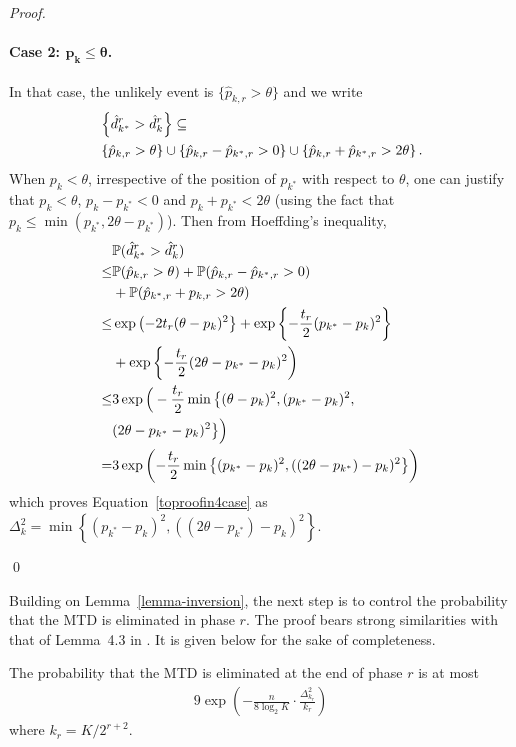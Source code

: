 \begin{proof}
\paragraph{Case 2: $\bm{p_k \leq \theta}$.} In that case, the unlikely event is $\{\hat{p}_{k,r} > \theta\}$ and we write 
\begin{align*}
&\Set{\hat{d}^r_{k^*} > \hat{d}^r_k} \subseteq
\\ &
\Set{\hat{p}_{k,r} > \theta} \cup \Set{\hat{p}_{{k},r} - \hat{p}_{k^*,r} > 0}\cup \Set{\hat{p}_{k,r} + \hat{p}_{{k^*},r} > 2\theta}.
\end{align*}
When $p_k < \theta$, irrespective of the position of $p_{k^*}$ with respect to $\theta$, one can justify that $p_k < \theta$, $p_{k} - p_{k^*} < 0$ and ${p}_{k} + {p}_{{k^*}} < 2\theta$ (using the fact that $p_k \leq \min(p_{k^*},2\theta - p_{k^*})$). Then from Hoeffding's inequality,  
\begin{align*}
&\mathbb{P}(\hat{d}^r_{k^*} > \hat{d}^r_k)
\\ \leq &
	\mathbb{P}(\hat{p}_{k,r} > \theta)
	+ \mathbb{P}(\hat{p}_{{k},r} - \hat{p}_{k^*,r} > 0)
\\&	+ \mathbb{P}(\hat{p}_{k^*,r} + p_{k,r} > 2\theta)
\\ \leq &
	\exp\left( -2t_r (\theta - p_k)^2 \right\}
	+ \exp\left\{ - \frac{t_r}{2} (p_{k^*} - p_k)^2 \right\}
\\ &
	+ \exp\left\{ - \frac{t_r}{2} (2\theta - p_{k^*} - p_k)^2 \right)
\\ \leq &
	3 \exp\Big( -\frac{t_r}{2} \min\big\{(\theta - p_k)^2,
		(p_{k^*} - p_k)^2,
\\&		(2\theta - p_{k^*} -p_k)^2
	  \big\} \Big)
\\ = &
	3 \exp\left( -\frac{t_r}{2} \min\left\{
		(p_{k^*} - p_{k})^2,
		((2\theta - p_{k^*}) - p_k)^2
	  \right\} \right)
\end{align*}
which proves Equation~\ref{toproofin4case} as 
\\
$\Delta_k^2 =\min\left\{
		(p_{k^*} - p_{k})^2,
		((2\theta - p_{k^*}) - p_k)^2
	  \right\}$. 

\qed
\end{proof}


Building on Lemma~\ref{lemma-inversion}, the next step is to control the probability that the MTD is eliminated in phase $r$. The proof bears strong similarities with that of Lemma~4.3 in \cite{Karnin13}. It is given below for the sake of completeness. 

%
%
\begin{lemma}
\label{lemma-best-survives}
The probability that the MTD is eliminated at the end of phase $r$ is at most
\begin{align*}
9 \exp\left(
	- \frac{n}{8 \log_2 K} \cdot \frac{\Delta^2_{k_r}}{k_r}
\right)	
\end{align*}
where $k_r = K/2^{r + 2}$.
\end{lemma}
%
%

